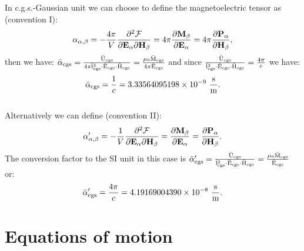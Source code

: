 \documentclass[12pt,a4paper,twoside]{report}
\def\alphatoalpha{3.33564095198\times 10^{-9}}
\def\alphaptoalphap{4.19169004390\times 10^{-8}}
\begin{document}
{\color{orange} 
In c.g.s.-Gaussian unit we can choose to define the magnetoelectric 
tensor as (convention I): 
\begin{equation}
\alpha_{\alpha,\beta}=-{4 \pi\over V} {\partial^2 \mathcal{F} \over \partial 
{\bf E}_{\alpha} \partial {\bf H}_{\beta}}= 4 \pi {\partial {\bf M}_{\beta} 
\over \partial {\bf E}_{\alpha}}= 4 \pi
{\partial {\bf P}_{\alpha} \over \partial {\bf H}_{\beta}},
\end{equation}
then we have: ${\rm \bar \alpha_{cgs}}=
{{\rm \bar U_{cgs}} \over 4 \pi {\rm \bar l_{cgs}}^3\cdot {\rm \bar E_{cgs}} 
\cdot {\rm \bar H_{cgs}}}={\mu_0 {\rm \bar M_{cgs}} \over 4 \pi {\rm \bar E_{cgs}}}$ 
and since ${{\rm \bar U_{cgs}} \over {\rm \bar l_{cgs}}^3 \cdot {\rm \bar E_{cgs}}\cdot {\rm \bar H_{cgs}}} ={4 \pi \over c}$ we have:
\begin{equation}
{\rm \bar \alpha_{cgs}}={1 \over c} = \alphatoalpha\ {{\rm s} \over {\rm m}}.
\end{equation}
\\
Alternatively we can define (convention II):
\begin{equation}
\alpha'_{\alpha,\beta}=-{1\over V} {\partial^2 \mathcal{F} \over \partial 
{\bf E}_{\alpha} \partial {\bf H}_{\beta}}={\partial {\bf M}_{\beta} \over \partial 
{\bf E}_{\alpha}}={\partial {\bf P}_{\alpha} \over \partial 
{\bf H}_{\beta}}. 
\end{equation}
The conversion factor to the SI unit in this case is 
${\rm \bar \alpha'_{cgs}}={{\rm \bar U_{cgs}} \over {\rm \bar l_{cgs}}^3 
\cdot {\rm \bar E_{cgs}} \cdot 
{\rm \bar H_{cgs}}}={\mu_0 {\rm \bar M_{cgs}} \over {\rm \bar E_{cgs}}}$ or:
\begin{equation}
{\rm \bar \alpha'_{cgs}}={4 \pi \over c}=\alphaptoalphap\ {{\rm s}\over 
{\rm m}}.
\end{equation}
}

\newpage
{\color{dark-blue}\chapter{Equations of motion}}
\color{black}
\end{document}
